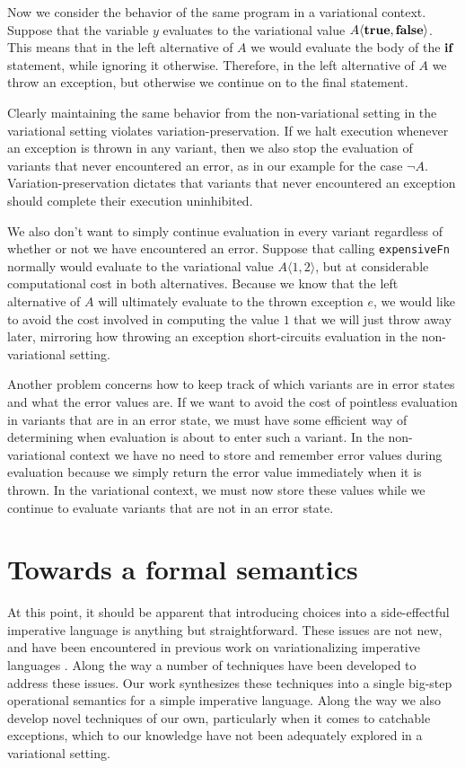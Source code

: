 \documentclass[12pt,oneside]{book}
\newcommand{\tagtree}[3]{#1 \langle #2, #3 \rangle}
\begin{document}
Now we consider the behavior of the same program in a variational context.
Suppose that the variable $y$ evaluates to the variational value
$\tagtree{A}{\CCkeyw{true}}{\CCkeyw{false}}$. This means that in the left alternative of $A$ we
would evaluate the body of the $\textbf{\textup{\textrm{if}}}$ statement, while ignoring it otherwise. Therefore,
in the left alternative of $A$ we throw an exception, but otherwise we continue on to the
final statement.

Clearly maintaining the same behavior from the non-variational setting in the variational setting
violates variation-preservation. If we halt execution whenever an exception is
thrown in any variant, then we also stop the evaluation of variants that never encountered an error,
as in our example for the case $\neg A$. Variation-preservation dictates that variants that never encountered
an exception should complete their execution uninhibited.

We also don't want to simply continue evaluation
in every variant regardless of whether or not we have encountered an error.
Suppose that calling \texttt{expensiveFn} normally would evaluate to the variational value $\tagtree{A}{1}{2}$, but at considerable computational cost in both alternatives.
Because we know that the left alternative of $A$ will ultimately evaluate to the thrown exception $e$, we would
like to avoid the cost involved in computing the value $1$ that we will just throw away later, mirroring how throwing an exception short-circuits evaluation in the
non-variational setting. 

Another problem concerns how to keep track of which variants are in error states and what
the error values are. If we want to avoid the cost of pointless evaluation in variants that are in an error
state, we must have some efficient way of determining when evaluation is about to enter such a variant.
In the non-variational context we have no need to store and remember error values during evaluation
because we simply return the error value immediately when it is thrown. In the variational context, we
must now store these values while we continue to evaluate variants that are not in an error state.

\section{Towards a formal semantics}

At this point, it should be apparent that introducing choices into a side-effectful imperative language
is anything but straightforward. These issues are not new, and have been encountered in previous
work on variationalizing imperative languages \cite{varwhile,varex,varexj}. Along the way a number of
techniques have been developed to address these issues. Our work synthesizes these techniques into
a single big-step operational semantics for a simple imperative language. Along the way we also develop
novel techniques of our own, particularly when it comes to catchable exceptions, which to our knowledge
have not been adequately explored in a variational setting.
\end{document}
